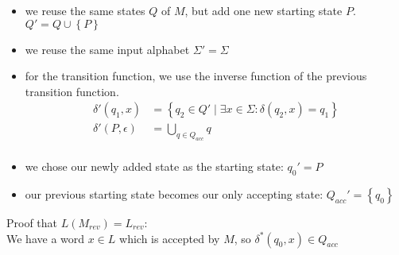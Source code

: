 \begin{itemize}
    \item we reuse the same states $Q$ of $M$, but add one new starting state $P$.\\
    $Q' = Q \cup \left\{P\right\}$
    \item we reuse the same input alphabet $\Sigma' = \Sigma$
    \item for the transition function, we use the inverse function of the previous transition function.\\
    \begin{align*}
        \delta'(q_{1}, x) &= \left\{q_{2} \in Q' \mid \exists x \in \Sigma :\delta(q_{2},x) = q_{1}\right\}\\
        \delta'(P, \epsilon) &= \bigcup_{q \in Q_{acc}} q\\
    \end{align*}
    \item we chose our newly added state as the starting state: $q_{0}' = P$
    \item our previous starting state becomes our only accepting state: $Q_{acc}' = \left\{q_{0}\right\}$
\end{itemize}
Proof that $L(M_{rev}) = L_{rev}$:\\
We have a word $x\in L$ which is accepted by $M$, so $\delta^{*}(q_{0},x)\in Q_{acc}$

